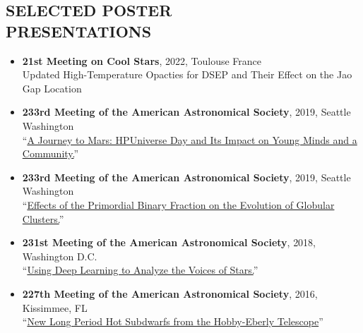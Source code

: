 \documentclass[margin, 10pt]{res} %
\begin{document}
\begin{resume}
\section{SELECTED POSTER\\PRESENTATIONS}
\begin{itemize}
	\item {\scriptsize \textbf{21st Meeting on Cool Stars}}, {\small 2022, Toulouse France}\\Updated High-Temperature Opacties for DSEP and Their Effect on the Jao Gap Location
	\item {\scriptsize \textbf{233rd Meeting of the American Astronomical Society}}, {\small 2019, Seattle Washington}\\ ``\href{https://ui.adsabs.harvard.edu/#abs/2019AAS...23314705C/abstract}{A Journey to Mars: HPUniverse Day and Its Impact on Young Minds and a Community.}''
	\item {\scriptsize \textbf{233rd Meeting of the American Astronomical Society}}, {\small 2019, Seattle Washington}\\ ``\href{https://ui.adsabs.harvard.edu/#abs/2019AAS...23324909B/abstract}{Effects of the Primordial Binary Fraction on the Evolution of Globular Clusters.}''
	\item \textbf{{\scriptsize 231st Meeting of the American Astronomical Society}}, {\small 2018, Washington D.C.}\\``\href{https://ui.adsabs.harvard.edu/#abs/2018AAS...23115029B/abstract}{Using Deep Learning to Analyze the Voices of Stars.}''
	\item \textbf{{\scriptsize 227th Meeting of the American Astronomical Society}}, {\small 2016, Kissimmee, FL}\\``\href{https://ui.adsabs.harvard.edu/#abs/2016AAS...22734412B/abstract}{New Long Period Hot Subdwarfs from the Hobby-Eberly Telescope}''
\end{itemize}


\end{resume}
\end{document}
